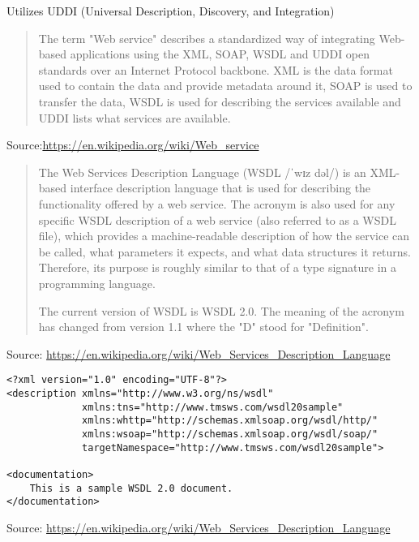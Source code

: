 \documentclass[Screen16to9,17pt]{foils}
\begin{document}
Utilizes  UDDI (Universal Description, Discovery, and Integration)


\begin{quote}
The term "Web service" describes a standardized way of integrating Web-based applications using the XML, SOAP, WSDL and UDDI open standards over an Internet Protocol backbone. XML is the data format used to contain the data and provide metadata around it, SOAP is used to transfer the data, WSDL is used for describing the services available and UDDI lists what services are available.
\end{quote}
Source:\url{https://en.wikipedia.org/wiki/Web_service}




\begin{quote}
  The Web Services Description Language (WSDL /ˈwɪz dəl/) is an XML-based interface description language that is used for describing the functionality offered by a web service. The acronym is also used for any specific WSDL description of a web service (also referred to as a WSDL file), which provides a machine-readable description of how the service can be called, what parameters it expects, and what data structures it returns. Therefore, its purpose is roughly similar to that of a type signature in a programming language.

  The current version of WSDL is WSDL 2.0. The meaning of the acronym has changed from version 1.1 where the "D" stood for "Definition".
\end{quote}
Source: \url{https://en.wikipedia.org/wiki/Web_Services_Description_Language}



\begin{verbatim}
<?xml version="1.0" encoding="UTF-8"?>
<description xmlns="http://www.w3.org/ns/wsdl"
             xmlns:tns="http://www.tmsws.com/wsdl20sample"
             xmlns:whttp="http://schemas.xmlsoap.org/wsdl/http/"
             xmlns:wsoap="http://schemas.xmlsoap.org/wsdl/soap/"
             targetNamespace="http://www.tmsws.com/wsdl20sample">

<documentation>
    This is a sample WSDL 2.0 document.
</documentation>
\end{verbatim}
Source: \url{https://en.wikipedia.org/wiki/Web_Services_Description_Language}
\end{document}
